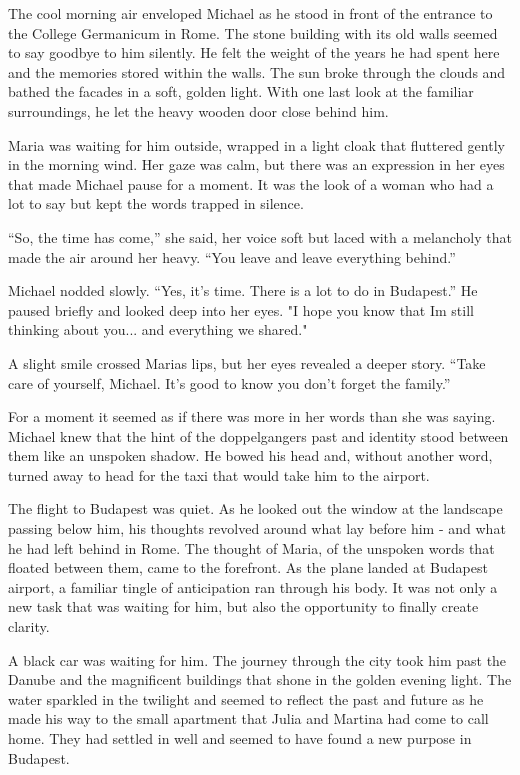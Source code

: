 \documentclass[
]{article}
\begin{document}
The cool morning air enveloped Michael as he stood in front of the
entrance to the College Germanicum in Rome. The stone building with its
old walls seemed to say goodbye to him silently. He felt the weight of
the years he had spent here and the memories stored within the walls.
The sun broke through the clouds and bathed the facades in a soft,
golden light. With one last look at the familiar surroundings, he let
the heavy wooden door close behind him.

Maria was waiting for him outside, wrapped in a light cloak that
fluttered gently in the morning wind. Her gaze was calm, but there was
an expression in her eyes that made Michael pause for a moment. It was
the look of a woman who had a lot to say but kept the words trapped in
silence.

``So, the time has come,'' she said, her voice soft but laced with a
melancholy that made the air around her heavy. ``You leave and leave
everything behind.''

Michael nodded slowly. ``Yes, it's time. There is a lot to do in
Budapest.'' He paused briefly and looked deep into her eyes. "I hope you
know that I\textquotesingle m still thinking about you... and everything
we shared."

A slight smile crossed Maria\textquotesingle s lips, but her eyes
revealed a deeper story. ``Take care of yourself, Michael. It's good to
know you don't forget the family.''

For a moment it seemed as if there was more in her words than she was
saying. Michael knew that the hint of the doppelganger\textquotesingle s
past and identity stood between them like an unspoken shadow. He bowed
his head and, without another word, turned away to head for the taxi
that would take him to the airport.

The flight to Budapest was quiet. As he looked out the window at the
landscape passing below him, his thoughts revolved around what lay
before him - and what he had left behind in Rome. The thought of Maria,
of the unspoken words that floated between them, came to the forefront.
As the plane landed at Budapest airport, a familiar tingle of
anticipation ran through his body. It was not only a new task that was
waiting for him, but also the opportunity to finally create clarity.

A black car was waiting for him. The journey through the city took him
past the Danube and the magnificent buildings that shone in the golden
evening light. The water sparkled in the twilight and seemed to reflect
the past and future as he made his way to the small apartment that Julia
and Martina had come to call home. They had settled in well and seemed
to have found a new purpose in Budapest.
\end{document}

